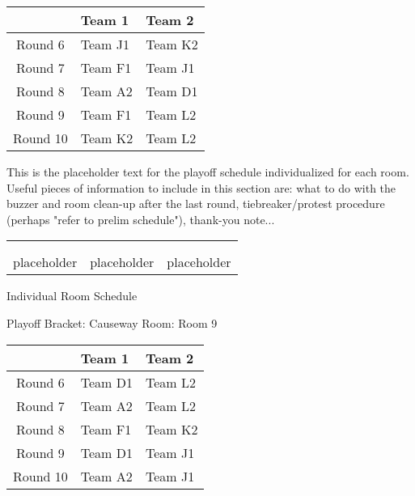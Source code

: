 \documentclass{article}%
\begin{document}
%
\begin{tabularx}{\textwidth}{|c|Y|Y|}%
\hline%
&Team 1&Team 2\\%
\hline%
Round 6&Team J1&Team K2\\%
Round 7&Team F1&Team J1\\%
Round 8&Team A2&Team D1\\%
Round 9&Team F1&Team L2\\%
Round 10&Team K2&Team L2\\%
\hline%
\end{tabularx}%
\vspace*{16pt}%
\linebreak%
This is the placeholder text for the playoff schedule individualized for each room. Useful pieces of information to include in this section are: what to do with the buzzer and room clean{-}up after the last round, tiebreaker/protest procedure (perhaps "refer to prelim schedule"), thank{-}you note...%
\vspace*{30pt}%
\newline%
%
\begin{tabularx}{\textwidth}{YYY}%
  &  &  \\%
\\%
placeholder&placeholder&placeholder\\%
\end{tabularx}%
\newpage%
\begin{center}%
\begin{Huge}%
Individual Room Schedule%
\end{Huge}%
\vspace*{16pt}%
\linebreak%
\begin{Large}%
Playoff Bracket: Causeway \hfill Room: Room 9%
\end{Large}%
\end{center}%
%
\begin{tabularx}{\textwidth}{|c|Y|Y|}%
\hline%
&Team 1&Team 2\\%
\hline%
Round 6&Team D1&Team L2\\%
Round 7&Team A2&Team L2\\%
Round 8&Team F1&Team K2\\%
Round 9&Team D1&Team J1\\%
Round 10&Team A2&Team J1\\%
\hline%
\end{tabularx}%
\end{document}
